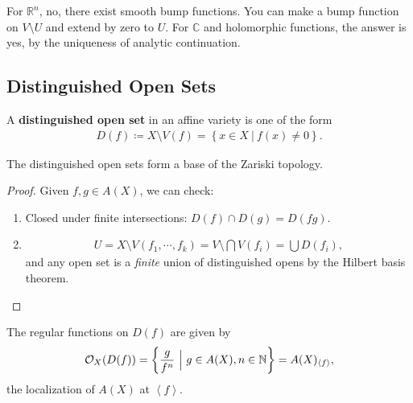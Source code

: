 \begin{answer}

For \({\mathbb{R}}^n\), no, there exist smooth bump functions. You can
make a bump function on \(V\setminus U\) and extend by zero to \(U\).
For \({\mathbb{C}}\) and holomorphic functions, the answer is yes, by
the uniqueness of analytic continuation.

\end{answer}

\hypertarget{distinguished-open-sets}{%
\subsection{Distinguished Open Sets}\label{distinguished-open-sets}}

\begin{definition}

A \textbf{distinguished open set} in an affine variety is one of the
form
\begin{align*}  
D(f) \coloneqq X\setminus V(f) = \left\{{x\in X {~\mathrel{\Big|}~}f(x) \neq 0}\right\}
.\end{align*}

\end{definition}

\begin{proposition}

The distinguished open sets form a base of the Zariski topology.

\end{proposition}

\begin{proof}

Given \(f, g\in A(X)\), we can check:

\begin{enumerate}
\def\labelenumi{\arabic{enumi}.}
\tightlist
\item
  Closed under finite intersections: \(D(f) \cap D(g) = D(fg)\).
\item

  \begin{align*}U = X\setminus V(f_1, \cdots, f_k) = V\setminus\bigcap V(f_i) = \bigcup D(f_i),\end{align*}
  and any open set is a \emph{finite} union of distinguished opens by
  the Hilbert basis theorem.
\end{enumerate}

\end{proof}

\begin{proposition}[?]

The regular functions on \(D(f)\) are given by
\begin{align*}  
{\mathcal{O}}_X(D(f)) = \left\{{{ g \over f^n} {~\mathrel{\Big|}~}g\in A(X), n\in {\mathbb{N}}}\right\} = A(X)_{\left\langle{f}\right\rangle}
,\end{align*}
the localization of \(A(X)\) at \(\left\langle{f}\right\rangle\).

\end{proposition}

